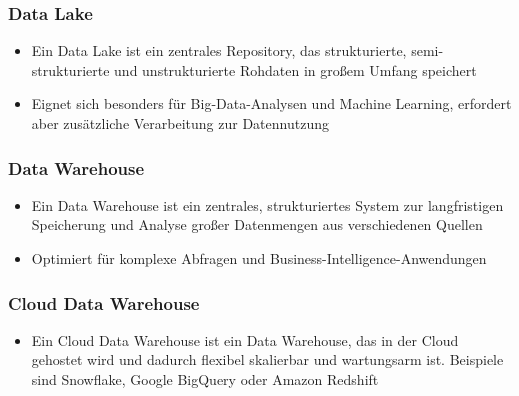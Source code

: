 \documentclass[11pt]{scrartcl}
\begin{document}
\subsubsection*{Data Lake}
\begin{itemize}
	\item Ein Data Lake ist ein zentrales Repository, das strukturierte, semi-strukturierte und unstrukturierte Rohdaten in großem Umfang speichert
	\item Eignet sich besonders für Big-Data-Analysen und Machine Learning, erfordert aber zusätzliche Verarbeitung zur Datennutzung
\end{itemize}

\subsubsection*{Data Warehouse}
\begin{itemize}
	\item Ein Data Warehouse ist ein zentrales, strukturiertes System zur langfristigen Speicherung und Analyse großer Datenmengen aus verschiedenen Quellen
	\item Optimiert für komplexe Abfragen und Business-Intelligence-Anwendungen
\end{itemize}

\subsubsection*{Cloud Data Warehouse}
\begin{itemize}
	\item Ein Cloud Data Warehouse ist ein Data Warehouse, das in der Cloud gehostet wird und dadurch flexibel skalierbar und wartungsarm ist. Beispiele sind Snowflake, Google BigQuery oder Amazon Redshift
\end{itemize}
\end{document}
